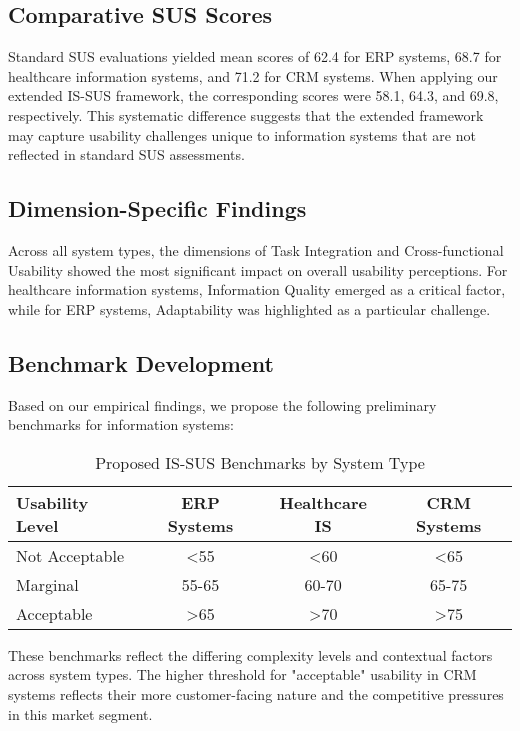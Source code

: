 \documentclass[blindrev]{informs3}
\begin{document}
\subsection{Comparative SUS Scores}\label{comparative-scores}

Standard SUS evaluations yielded mean scores of 62.4 for ERP systems, 68.7 for healthcare information systems, and 71.2 for CRM systems. When applying our extended IS-SUS framework, the corresponding scores were 58.1, 64.3, and 69.8, respectively. This systematic difference suggests that the extended framework may capture usability challenges unique to information systems that are not reflected in standard SUS assessments.

\subsection{Dimension-Specific Findings}\label{dimension-findings}

Across all system types, the dimensions of Task Integration and Cross-functional Usability showed the most significant impact on overall usability perceptions. For healthcare information systems, Information Quality emerged as a critical factor, while for ERP systems, Adaptability was highlighted as a particular challenge.

\subsection{Benchmark Development}\label{benchmark-development}

Based on our empirical findings, we propose the following preliminary benchmarks for information systems:

\begin{table}[h]
\centering
\begin{tabular}{|l|c|c|c|}
\hline
\textbf{Usability Level} & \textbf{ERP Systems} & \textbf{Healthcare IS} & \textbf{CRM Systems} \\
\hline
Not Acceptable & <55 & <60 & <65 \\
Marginal & 55-65 & 60-70 & 65-75 \\
Acceptable & >65 & >70 & >75 \\
\hline
\end{tabular}
\caption{Proposed IS-SUS Benchmarks by System Type}
\label{tab:benchmarks}
\end{table}

These benchmarks reflect the differing complexity levels and contextual factors across system types. The higher threshold for "acceptable" usability in CRM systems reflects their more customer-facing nature and the competitive pressures in this market segment.
\end{document}
